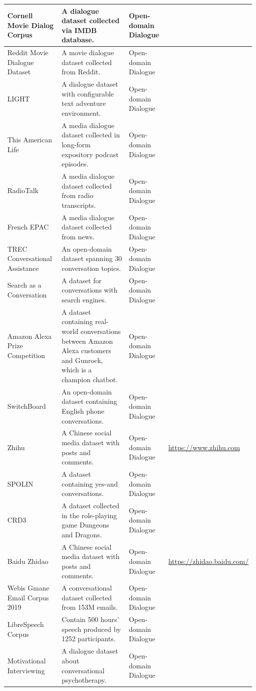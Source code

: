 \begin{longtable}{>{\centering\arraybackslash}y{2.5cm} y{5cm} >{\centering\arraybackslash}y{2cm} >{\centering\arraybackslash}y{2.5cm}}
Cornell Movie Dialog Corpus	&	A dialogue dataset collected via IMDB database.	&	Open-domain Dialogue	&	~	 \\\hline
Reddit Movie Dialogue Dataset	&	A movie dialogue dataset collected from Reddit.	&	Open-domain Dialogue	&	~	 \\\hline
LIGHT	&	A dialogue dataset with configurable text adventure environment.	&	Open-domain Dialogue	&	~	 \\\hline
This American Life	&	A media dialogue dataset collected in long-form expository podcast episodes.	&	Open-domain Dialogue	&	~	 \\\hline
RadioTalk	&	A media dialogue dataset collected from radio transcripts.	&	Open-domain Dialogue	&	~	 \\\hline
French EPAC	&	A media dialogue dataset collected from news.	&	Open-domain Dialogue	&	~	 \\\hline
TREC Conversational Assistance 	&	An open-domain dataset spanning 30 conversation topics.	&	Open-domain Dialogue	&	~	 \\\hline
Search as a Conversation	&	A dataset for conversations with search engines.	&	Open-domain Dialogue	&	~	 \\\hline
Amazon Alexa Prize Competition	&	A dataset containing real-world conversations between Amazon Alexa customers and Gunrock, which is a champion chatbot.	&	Open-domain Dialogue	&	~	 \\\hline
SwitchBoard	&	An open-domain dataset containing English phone conversations.	&	Open-domain Dialogue	&	~	 \\\hline
Zhihu	&	A Chinese social media dataset with posts and comments.	&	Open-domain Dialogue	&	\url{https://www.zhihu.com}	 \\\hline
SPOLIN	&	A dataset containing yes-and conversations.	&	Open-domain Dialogue	&	~	 \\\hline
CRD3	&	A dataset collected in the role-playing game Dungeons and Dragons.	&	Open-domain Dialogue	&	~	 \\\hline
Baidu Zhidao	&	A Chinese social media dataset with posts and comments.	&	Open-domain Dialogue	&	\url{https://zhidao.baidu.com/}	 \\\hline
Webis Gmane Email Corpus 2019	&	A conversational dataset collected from 153M emails.	&	Open-domain Dialogue	&	~	 \\\hline
LibreSpeech Corpus	&	Contain 500 hours' speech produced by 1252 participants.	&	Open-domain Dialogue	&	~	 \\\hline
Motivational Interviewing	&	A dialogue dataset about conversational psychotherapy.	&	Open-domain Dialogue	&	~	 \\\hline

\end{longtable}
